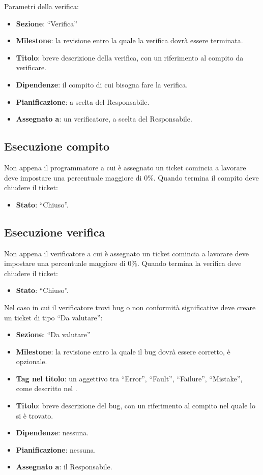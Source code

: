 Parametri della verifica:
\begin{itemize}
 \item \textbf{Sezione}: ``Verifica''
 \item \textbf{Milestone}: la revisione entro la quale la verifica dovrà essere terminata.
 \item \textbf{Titolo}: breve descrizione della verifica, con un riferimento al compito da verificare.
 \item \textbf{Dipendenze}: il compito di cui bisogna fare la verifica.
 \item \textbf{Pianificazione}: a scelta del Responsabile.
 \item \textbf{Assegnato a}: un verificatore, a scelta del Responsabile.
\end{itemize}

\subsection{Esecuzione compito}

Non appena il programmatore a cui è assegnato un ticket comincia a lavorare deve impostare una percentuale maggiore di $0\%$. Quando termina il compito deve chiudere il ticket:
\begin{itemize}
 \item \textbf{Stato}: ``Chiuso''.
\end{itemize}
 
\subsection{Esecuzione verifica}

Non appena il verificatore a cui è assegnato un ticket comincia a lavorare deve impostare una percentuale maggiore di $0\%$. Quando termina la verifica deve chiudere il ticket:
\begin{itemize}
 \item \textbf{Stato}: ``Chiuso''.
\end{itemize}

Nel caso in cui il verificatore trovi bug o non conformità significative deve creare un ticket di tipo ``Da valutare'':
\begin{itemize}
 \item \textbf{Sezione}: ``Da valutare''
 \item \textbf{Milestone}: la revisione entro la quale il bug dovrà essere corretto, è opzionale.
 \item \textbf{Tag nel titolo}: un aggettivo tra ``Error'', ``Fault'', ``Failure'', ``Mistake'', come descritto nel \PianoDiQualifica.
 \item \textbf{Titolo}: breve descrizione del bug, con un riferimento al compito nel quale lo si è trovato.
 \item \textbf{Dipendenze}: nessuna.
 \item \textbf{Pianificazione}: nessuna.
 \item \textbf{Assegnato a}: il Responsabile.
\end{itemize}


